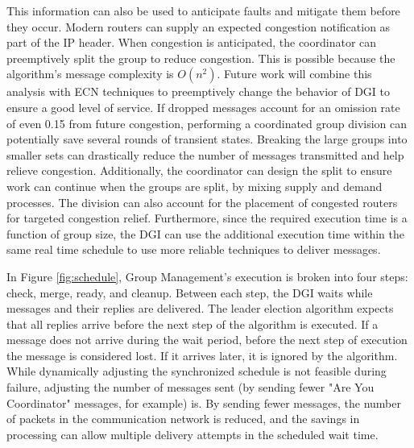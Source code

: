 This information can also be used to anticipate faults and mitigate them before they occur.
Modern routers can supply an expected congestion notification as part of the IP header\cite{ECN2}.
When congestion is anticipated, the coordinator can preemptively split the group to reduce congestion.
This is possible because the algorithm's message complexity is $O(n^2)$.
Future work will combine this analysis with ECN techniques to preemptively change the behavior of DGI to ensure a good level of service.
If dropped messages account for an omission rate of even 0.15 from future congestion, performing a coordinated group division can potentially save several rounds of transient states.
Breaking the large groups into smaller sets can drastically reduce the number of messages transmitted and help relieve congestion.
Additionally, the coordinator can design the split to ensure work can continue when the groups are split, by mixing supply and demand processes.
The division can also account for the placement of congested routers for targeted congestion relief.
Furthermore, since the required execution time is a function of group size, the DGI can use the additional execution time within the same real time schedule to use more reliable techniques to deliver messages.


In Figure \ref{fig:schedule}, Group Management's execution is broken into four steps: check, merge, ready, and cleanup.
Between each step, the DGI waits while messages and their replies are delivered.
The leader election algorithm expects that all replies arrive before the next step of the algorithm is executed.
If a message does not arrive during the wait period, before the next step of execution the message is considered lost.
If it arrives later, it is ignored by the algorithm.
While dynamically adjusting the synchronized schedule is not feasible during failure, adjusting the number of messages sent (by sending fewer "Are You Coordinator" messages, for example) is.
By sending fewer messages, the number of packets in the communication network is reduced, and the savings in processing can allow multiple delivery attempts in the scheduled wait time.
